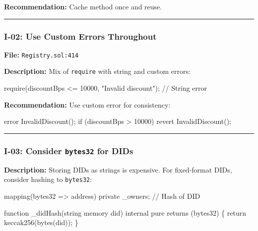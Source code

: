 \documentclass[
]{article}
\newenvironment{Shaded}{}{}
\newcommand{\NormalTok}[1]{#1}
\begin{document}
\textbf{Recommendation:} Cache method once and reuse.

\begin{center}\rule{0.5\linewidth}{0.5pt}\end{center}

\subsubsection{I-02: Use Custom Errors
Throughout}\label{i-02-use-custom-errors-throughout}

\textbf{File:} \texttt{Registry.sol:414}

\textbf{Description:} Mix of \texttt{require} with string and custom
errors:

\begin{Shaded}
\begin{Highlighting}[]
\NormalTok{require(discountBps \textless{}= 10000, "Invalid discount");  // String error}
\end{Highlighting}
\end{Shaded}

\textbf{Recommendation:} Use custom error for consistency:

\begin{Shaded}
\begin{Highlighting}[]
\NormalTok{error InvalidDiscount();}
\NormalTok{if (discountBps \textgreater{} 10000) revert InvalidDiscount();}
\end{Highlighting}
\end{Shaded}

\begin{center}\rule{0.5\linewidth}{0.5pt}\end{center}

\subsubsection{\texorpdfstring{I-03: Consider \texttt{bytes32} for
DIDs}{I-03: Consider bytes32 for DIDs}}\label{i-03-consider-bytes32-for-dids}

\textbf{Description:} Storing DIDs as strings is expensive. For
fixed-format DIDs, consider hashing to \texttt{bytes32}:

\begin{Shaded}
\begin{Highlighting}[]
\NormalTok{mapping(bytes32 =\textgreater{} address) private \_owners;  // Hash of DID}

\NormalTok{function \_didHash(string memory did) internal pure returns (bytes32) \{}
\NormalTok{    return keccak256(bytes(did));}
\NormalTok{\}}
\end{Highlighting}
\end{Shaded}
\end{document}

